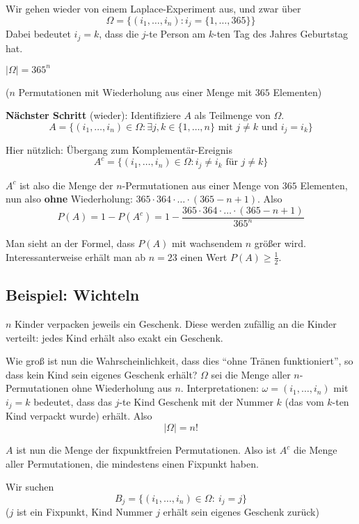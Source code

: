 Wir gehen wieder von einem Laplace-Experiment aus, und zwar über
\[ \Omega = \{ (i_1,\ldots,i_n) : i_j = \{ 1,\ldots,365 \} \} \]
Dabei bedeutet $i_j=k$, dass die $j$-te Person am $k$-ten Tag des Jahres Geburtstag hat.

\begin{center}
$|\Omega| = 365^n$ 

($n$ Permutationen mit Wiederholung aus einer Menge mit $365$ Elementen)
\end{center}

\textbf{Nächster Schritt} (wieder):
Identifiziere $A$ als Teilmenge von $\Omega$.
\[ A = \{ (i_1,\ldots,i_n) \in \Omega : \exists j,k \in \{1,\ldots,n\}\text{ mit }j\neq k \text{ und } i_j=i_k  \} \]

Hier nützlich: Übergang zum Komplementär-Ereignis
\[ A^c = \{ (i_1,\ldots,i_n) \in \Omega : i_j \neq i_k \text{ für } j \neq k \}\]

$A^c$ ist also die Menge der $n$-Permutationen aus einer Menge von $365$ Elementen, nun also \textbf{ohne} Wiederholung:
$365 \cdot 364 \cdot \ldots \cdot (365 - n +1)$.
Also
\[ P(A) = 1-P(A^c) = 1 - \frac{365 \cdot 364 \cdot \ldots \cdot (365 - n +1)}{365^n} \]

Man sieht an der Formel, dass $P(A)$ mit wachsendem $n$ größer wird.
Interessanterweise erhält man ab $n=23$ einen Wert $P(A) \geq \frac{1}{2}$.

\subsection{Beispiel: Wichteln}

$n$ Kinder verpacken jeweils ein Geschenk.
Diese werden zufällig an die Kinder verteilt: jedes Kind erhält also exakt ein Geschenk.

Wie groß ist nun die Wahrscheinlichkeit, dass dies ``ohne Tränen funktioniert'', so dass kein Kind sein eigenes Geschenk erhält?
$\Omega$ sei die Menge aller $n$-Permutationen ohne Wiederholung aus $n$. Interpretationen:
$\omega = (i_1,\ldots,i_n)$ mit $i_j=k$ bedeutet, dass das $j$-te Kind Geschenk mit der Nummer $k$ 
(das vom $k$-ten Kind verpackt wurde) erhält.
Also 
\[ |\Omega| = n! \]

$A$ ist nun die Menge der fixpunktfreien Permutationen. Also ist $A^c$ die Menge aller Permutationen, die mindestens einen Fixpunkt haben.

Wir suchen
\[ B_j = \{ (i_1,\ldots,i_n)\in \Omega:\ i_j=j \} \]
($j$ ist ein Fixpunkt, Kind Nummer $j$ erhält sein eigenes Geschenk zurück)

